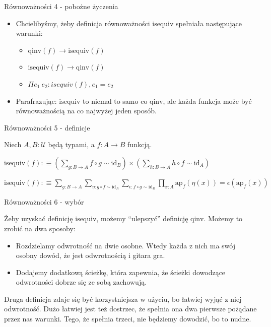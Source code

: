 \documentclass{beamer}
\newcommand{\defn}{:\equiv}
\newcommand{\U}{\mathcal{U}}
\newcommand{\id}{\text{id}}
\newcommand{\comp}{\circ}
\newcommand{\ap}[2]{\text{ap}_{#1}(#2)}
\newcommand{\qinv}{\text{qinv}}
\newcommand{\isequiv}{\text{isequiv}}
\begin{document}
\begin{frame}{Równoważności 4 - pobożne życzenia}
\begin{itemize}
	\item Chcielibyśmy, żeby definicja równoważności $\isequiv$ spełniała następujące warunki:
	\begin{itemize}
		\item $\qinv(f) \to \isequiv(f)$
		\item $\isequiv(f) \to \qinv(f)$
		\item $\Pi e_1\ e_2 : isequiv(f), e_1 = e_2$
	\end{itemize}
	\item Parafrazując: $\isequiv$ to niemal to samo co $\qinv$, ale każda funkcja może być równoważnością na co najwyżej jeden sposób.
\end{itemize}
\end{frame}

\begin{frame}{Równoważności 5 - definicje}

Niech $A, B : \U$ będą typami, a $f : A \to B$ funkcją.

\begin{definition}[Równoważność 1]
$
\displaystyle
	\isequiv(f) \defn
		\left(\sum_{g : B \to A} f \comp g \sim \id_B\right) \times
		\left(\sum_{h : B \to A} h \comp f \sim \id_A\right)
$
\end{definition}

\begin{definition}[Równoważność 2]
$
\displaystyle
	\isequiv(f) \defn
		\sum_{g : B \to A} \sum_{\eta : g \comp f \sim \id_A} \sum_{\epsilon : f \comp g \sim \id_B}
			\prod_{x : A} \ap{f}{\eta(x)} = \epsilon(\ap{f}{x})
$
\end{definition}

\end{frame}


\begin{frame}{Równoważności 6 - wybór}

Żeby uzyskać definicję $\isequiv$, możemy ``ulepszyć'' definicję $\qinv$. Możemy to zrobić na dwa sposoby:

\begin{itemize}
	\item Rozdzielamy odwrotność na dwie osobne. Wtedy każda z nich ma swój osobny dowód, że jest odwrotnością i gitara gra.
	\item Dodajemy dodatkową ścieżkę, która zapewnia, że ścieżki dowodzące odwrotności dobrze się ze sobą zachowują.
\end{itemize}

Druga definicja zdaje się być korzystniejsza w użyciu, bo łatwiej wyjąć z niej odwrotność. Dużo łatwiej jest też dostrzec, że spełnia ona dwa pierwsze pożądane przez nas warunki. Tego, że spełnia trzeci, nie będziemy dowodzić, bo to nudne.

\end{frame}
\end{document}
